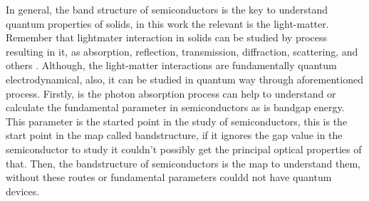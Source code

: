 In general, the band structure of semiconductors is the key to understand quantum
properties of solids, in this work the relevant is the light-matter. Remember that lightmater
interaction in solids can be studied by process resulting in it, as absorption,
reflection, transmission, diffraction, scattering, and others \cite{rivera2020light}. Although, the light-matter
interactions are fundamentally quantum electrodynamical, also, it can be studied in quantum
way through aforementioned process. Firstly, is the photon absorption process can help
to understand or calculate the fundamental parameter in semiconductors as is bandgap
energy. This parameter is the started point in the study of semiconductors, this is the start
point in the map called bandstructure, if it ignores the gap value in the semiconductor to
study it couldn't possibly get the principal optical properties of that.
Then, the bandstructure of semiconductors is the map to understand them, without these
routes or fundamental parameters couldd not have quantum devices.
 
